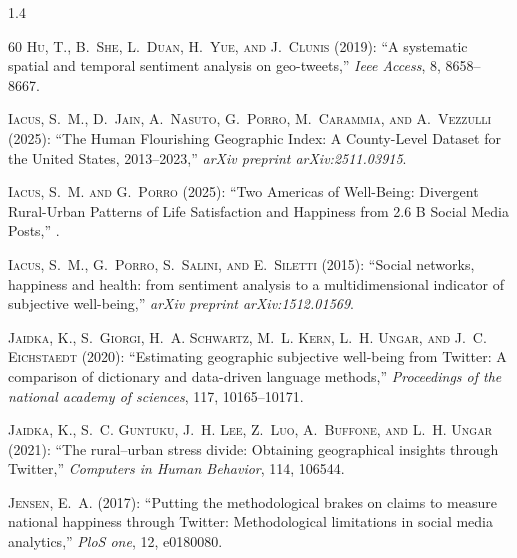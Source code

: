 \documentclass[10pt, letterpaper]{article}
\begin{document}
\begin{spacing}{1.4}
\begin{thebibliography}{60}
\textsc{Hu, T., B.~She, L.~Duan, H.~Yue, and J.~Clunis} (2019): \enquote{A
  systematic spatial and temporal sentiment analysis on geo-tweets,} \emph{Ieee
  Access}, 8, 8658--8667.

\textsc{Iacus, S.~M., D.~Jain, A.~Nasuto, G.~Porro, M.~Carammia, and
  A.~Vezzulli} (2025): \enquote{The Human Flourishing Geographic Index: A
  County-Level Dataset for the United States, 2013--2023,} \emph{arXiv preprint
  arXiv:2511.03915}.

\textsc{Iacus, S.~M. and G.~Porro} (2025): \enquote{Two Americas of Well-Being:
  Divergent Rural-Urban Patterns of Life Satisfaction and Happiness from 2.6 B
  Social Media Posts,} .

\textsc{Iacus, S.~M., G.~Porro, S.~Salini, and E.~Siletti} (2015):
  \enquote{Social networks, happiness and health: from sentiment analysis to a
  multidimensional indicator of subjective well-being,} \emph{arXiv preprint
  arXiv:1512.01569}.

\textsc{Jaidka, K., S.~Giorgi, H.~A. Schwartz, M.~L. Kern, L.~H. Ungar, and
  J.~C. Eichstaedt} (2020): \enquote{Estimating geographic subjective
  well-being from Twitter: A comparison of dictionary and data-driven language
  methods,} \emph{Proceedings of the national academy of sciences}, 117,
  10165--10171.

\textsc{Jaidka, K., S.~C. Guntuku, J.~H. Lee, Z.~Luo, A.~Buffone, and L.~H.
  Ungar} (2021): \enquote{The rural--urban stress divide: Obtaining
  geographical insights through Twitter,} \emph{Computers in Human Behavior},
  114, 106544.

\textsc{Jensen, E.~A.} (2017): \enquote{Putting the methodological brakes on
  claims to measure national happiness through Twitter: Methodological
  limitations in social media analytics,} \emph{PloS one}, 12, e0180080.


\end{thebibliography}
\end{spacing}
\end{document}
